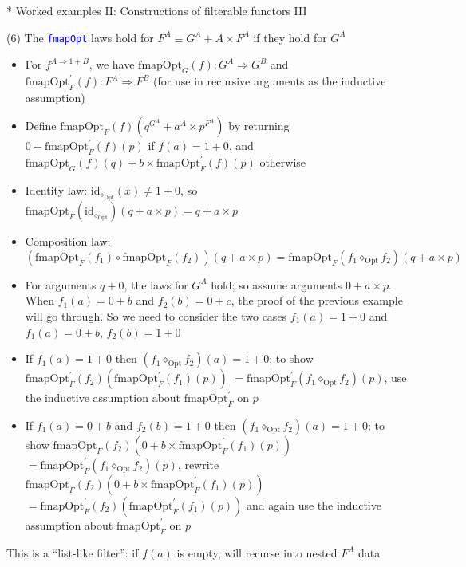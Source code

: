 \documentclass[english]{beamer}
\begin{document}
\begin{frame}{{*} Worked examples II: Constructions of filterable functors III}

(6) The \texttt{\textcolor{blue}{\footnotesize{}fmapOpt}} laws hold
for $F^{A}\equiv G^{A}+A\times F^{A}$ if they hold for $G^{A}$
\begin{itemize}
\item {\footnotesize{}For $f^{A\Rightarrow1+B}$, we have $\text{fmapOpt}_{G}(f):G^{A}\Rightarrow G^{B}$
and $\text{fmapOpt}_{F}^{\prime}(f):F^{A}\Rightarrow F^{B}$ (for
use in recursive arguments as the inductive assumption)}{\footnotesize \par}
\item {\footnotesize{}Define $\text{fmapOpt}_{F}(f)(q^{G^{A}}+a^{A}\times p^{F^{A}})$
by returning $0+\text{fmapOpt}_{F}^{\prime}(f)(p)$ if $f(a)=1+0$,
and $\text{fmapOpt}_{G}(f)(q)+b\times\text{fmapOpt}_{F}^{\prime}(f)(p)$
otherwise}{\footnotesize \par}
\item Identity law: {\footnotesize{}$\text{id}_{\diamond_{\text{Opt}}}(x)\neq1+0$},
so {\footnotesize{}$\text{fmapOpt}_{F}(\text{id}_{\diamond_{\text{Opt}}})(q+a\times p)=q+a\times p$ }{\footnotesize \par}
\item Composition law: {\footnotesize{}$(\text{fmapOpt}_{F}(f_{1})\circ\text{fmapOpt}_{F}(f_{2}))(q+a\times p)=\text{fmapOpt}_{F}(f_{1}\diamond_{\text{Opt}}f_{2})(q+a\times p)$}{\footnotesize \par}
\item {\footnotesize{}For arguments $q+0$, the laws for $G^{A}$ hold;
so assume arguments $0+a\times p$. When $f_{1}(a)=0+b$ and $f_{2}(b)=0+c$,
the proof of the previous example will go through. So we need to consider
the two cases $f_{1}(a)=1+0$ and $f_{1}(a)=0+b$, $f_{2}(b)=1+0$ }{\footnotesize \par}
\item {\footnotesize{}If $f_{1}(a)=1+0$ then $(f_{1}\diamond_{\text{Opt}}f_{2})(a)=1+0$;
to show $\text{fmapOpt}_{F}^{\prime}(f_{2})(\text{fmapOpt}_{F}^{\prime}(f_{1})(p))$
$=\text{fmapOpt}_{F}^{\prime}(f_{1}\diamond_{\text{Opt}}f_{2})(p)$,
use the inductive assumption about $\text{fmapOpt}_{F}^{\prime}$
on $p$}{\footnotesize \par}
\item {\footnotesize{}If $f_{1}(a)=0+b$ and $f_{2}(b)=1+0$ then $(f_{1}\diamond_{\text{Opt}}f_{2})(a)=1+0$;
to show $\text{fmapOpt}_{F}(f_{2})(0+b\times\text{fmapOpt}_{F}^{\prime}(f_{1})(p))$
$=\text{fmapOpt}_{F}^{\prime}(f_{1}\diamond_{\text{Opt}}f_{2})(p)$,
rewrite $\text{fmapOpt}_{F}(f_{2})(0+b\times\text{fmapOpt}_{F}^{\prime}(f_{1})(p))$
$=\text{fmapOpt}_{F}^{\prime}(f_{2})(\text{fmapOpt}_{F}^{\prime}(f_{1})(p))$
and again use the inductive assumption about $\text{fmapOpt}_{F}^{\prime}$
on $p$}{\footnotesize \par}
\end{itemize}
This is a ``list-like filter'': if $f(a)$ is empty, will recurse
into nested $F^{A}$ data
\end{frame}
\end{document}
